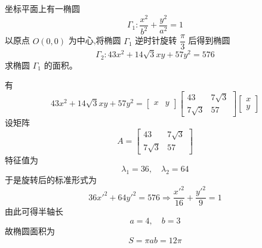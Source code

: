 \begin{questions}
    \question 坐标平面上有一椭圆 
    \[
    \Gamma_1: \frac{x^2}{b^2} + \frac{y^2}{a^2} = 1
    \] 
    以原点 $O(0,0)$ 为中心,将椭圆 $\Gamma_1$ 逆时针旋转 $\dfrac{\pi}{3}$ 后得到椭圆 
    \[
    \Gamma_2: 43x^2 + 14\sqrt{3}xy + 57y^2 = 576
    \] 
    求椭圆 $\Gamma_1$ 的面积。
    \begin{solution}
        有
        \[
        43x^2 + 14\sqrt{3}xy + 57y^2 = 
        \begin{bmatrix} x & y \end{bmatrix}
        \begin{bmatrix} 43 & 7\sqrt{3} \\ 7\sqrt{3} & 57 \end{bmatrix} 
        \begin{bmatrix} x \\ y \end{bmatrix}
        \]
        设矩阵 
        \[
        A = \begin{bmatrix} 43 & 7\sqrt{3} \\ 7\sqrt{3} & 57 \end{bmatrix}
        \] 
        特征值为
        \[
        \lambda_1 = 36, \quad \lambda_2 = 64
        \]
        于是旋转后的标准形式为
        \[
        36x'^2 + 64y'^2 = 576 \Rightarrow \frac{x'^2}{16} + \frac{y'^2}{9} = 1
        \]
        由此可得半轴长
        \[
        a = 4, \quad b = 3
        \]
        故椭圆面积为
        \[
        S = \pi a b = 12 \pi
        \]
    \end{solution}


\end{questions}
